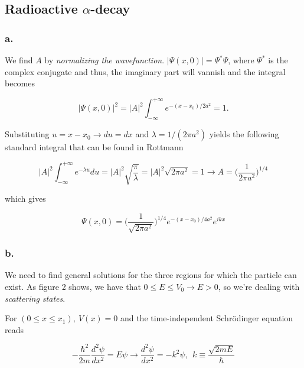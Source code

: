 \documentclass{article}
\begin{document}
\subsection*{Radioactive $\alpha$-decay}

\subsubsection*{a.}

We find $A$ by \textit{normalizing the wavefunction}. $|\Psi(x, 0)| = \Psi^*\Psi$, where $\Psi^*$ is the complex conjugate and thus, the imaginary part will vannish and the integral becomes

\begin{equation}
|\Psi(x, 0)|^2 = |A|^2\int_{-\infty}^{+\infty}e^{-(x-x_0)/2a^2} = 1.
\end{equation}

Substituting $u = x-x_0 \rightarrow du = dx$ and $\lambda = 1/(2\pi a^2)$ yields the following standard integral that can be found in Rottmann

\begin{equation}
|A|^2\int_{-\infty}^{+\infty} e^{-\lambda u} du = |A|^2\sqrt{\frac{\pi}{\lambda}} = |A|^2\sqrt{2\pi a^2} = 1 \rightarrow A = \bigg(\frac{1}{2\pi a^2}\bigg)^{1/4}
\end{equation}

which gives 

\begin{equation}
\Psi(x, 0) = \bigg(\frac{1}{\sqrt{2\pi a^2}}\bigg)^{1/4}e^{-(x-x_0)/4a^2}e^{ikx}
\end{equation}



\subsubsection*{b.}

We need to find general solutions for the three regions for which the particle can exist. As figure 2 shows, we have that $0 \leq E \leq V_0 \rightarrow E > 0$, so we're dealing with \textit{scattering states}.

\bigskip

For $(0 \leq x \leq x_1), \ V(x) = 0$ and the time-independent Schrödinger equation reads

\begin{equation}
-\frac{\hbar^2}{2m}\frac{d^2\psi}{dx^2} = E\psi \rightarrow \frac{d^2\psi}{dx^2} = -k^2\psi, \ \ k \equiv \frac{\sqrt{2mE}}{\hbar}
\end{equation}
\end{document}
